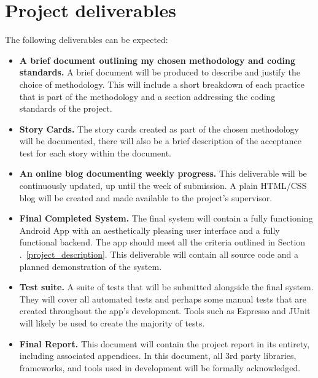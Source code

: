 \documentclass[11pt,fleqn,twoside]{article}
\begin{document}
\section{Project deliverables} \label{project_deliverables}
The following deliverables can be expected:

\begin{itemize}
	\item \textbf{A brief document outlining my chosen methodology and coding standards.} A brief document will be produced to describe and justify the choice of methodology. This will include a short breakdown of each practice that is part of the methodology and a section addressing the coding standards of the project.
	\item \textbf{Story Cards.} The story cards created as part of the chosen methodology will be documented, there will also be a brief description of the acceptance test for each story within the document.
	\item \textbf{An online blog documenting weekly progress.} This deliverable will be continuously updated, up until the week of submission. A plain HTML/CSS blog will be created and made available to the project's supervisor.
	\item \textbf{Final Completed System.} The final system will contain a fully functioning Android App with an aesthetically pleasing user interface and a fully functional backend. The app should meet all the criteria outlined in Section .~\ref{project_description}. This deliverable will contain all source code and a planned demonstration of the system.
	\item \textbf{Test suite.} A suite of tests that will be submitted alongside the final system. They will cover all automated tests and perhaps some manual tests that are created throughout the app's development. Tools such as Espresso and JUnit will likely be used to create the majority of tests.
	\item \textbf{Final Report.} This document will contain the project report in its entirety, including associated appendices. In this document, all 3rd party libraries, frameworks, and tools used in development will be formally acknowledged. 
\end{itemize}


\nocite{*}
\newpage
{}

\renewcommand{\refname}{Initial Annotated Bibliography}

\end{document}

